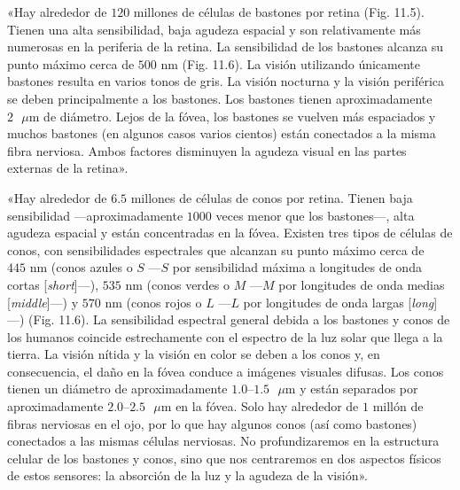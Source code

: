 \documentclass[12pt]{book}
\begin{document}
«Hay alrededor de $120$ millones de células de bastones por retina (Fig. 11.5). Tienen una alta sensibilidad, baja agudeza espacial y son relativamente más numerosas en la periferia de la retina. La sensibilidad de los bastones alcanza su punto máximo cerca de $500\text{ nm}$ (Fig. 11.6). La visión utilizando únicamente bastones resulta en varios tonos de gris. La visión nocturna y la visión periférica se deben principalmente a los bastones. Los bastones tienen aproximadamente $2\text{ }\mu\text{m}$ de diámetro. Lejos de la fóvea, los bastones se vuelven más espaciados y muchos bastones (en algunos casos varios cientos) están conectados a la misma fibra nerviosa. Ambos factores disminuyen la agudeza visual en las partes externas de la retina».

«Hay alrededor de $6.5$ millones de células de conos por retina. Tienen baja sensibilidad ---aproximadamente $1000$ veces menor que los bastones---, alta agudeza espacial y están concentradas en la fóvea. Existen tres tipos de células de conos, con sensibilidades espectrales que alcanzan su punto máximo cerca de $445\text{ nm}$ (conos azules o $S$ ---$S$ por sensibilidad máxima a longitudes de onda cortas [\emph{short}]---), $535\text{ nm}$ (conos verdes o $M$ ---$M$ por longitudes de onda medias [\emph{middle}]---) y $570\text{ nm}$ (conos rojos o $L$ ---$L$ por longitudes de onda largas [\emph{long}]---) (Fig. 11.6). La sensibilidad espectral general debida a los bastones y conos de los humanos coincide estrechamente con el espectro de la luz solar que llega a la tierra. La visión nítida y la visión en color se deben a los conos y, en consecuencia, el daño en la fóvea conduce a imágenes visuales difusas. Los conos tienen un diámetro de aproximadamente $1.0\text{--}1.5\text{ }\mu\text{m}$ y están separados por aproximadamente $2.0\text{--}2.5\text{ }\mu\text{m}$ en la fóvea. Solo hay alrededor de $1$ millón de fibras nerviosas en el ojo, por lo que hay algunos conos (así como bastones) conectados a las mismas células nerviosas. No profundizaremos en la estructura celular de los bastones y conos, sino que nos centraremos en dos aspectos físicos de estos sensores: la absorción de la luz y la agudeza de la visión».
\end{document}
